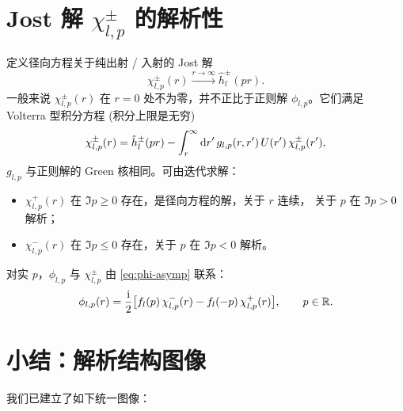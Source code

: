 \section{Jost 解 $\chi^\pm_{l,p}$ 的解析性}\label{sec:jost-solutions}

定义径向方程关于纯出射 / 入射的 Jost 解
\begin{equation}
\chi^\pm_{l,p}(r)\xrightarrow{r\to\infty}\hat h^\pm_l(pr).
\end{equation}
一般来说 $\chi^\pm_{l,p}(r)$ 在 $r=0$ 处不为零，并不正比于正则解
$\phi_{l,p}$。它们满足 Volterra 型积分方程 (积分上限是无穷)
\begin{equation}
\chi^\pm_{l,p}(r)=\hat h^\pm_l(pr)-\int_r^\infty\mathrm{d} r'\,g_{l,p}(r,r')\,U(r')\,\chi^\pm_{l,p}(r'),
\label{eq:chi-volterra}
\end{equation}
$g_{l,p}$ 与正则解的 Green 核相同。可由迭代求解：
\begin{itemize}
\item $\chi^+_{l,p}(r)$ 在 $\Im p\geq 0$ 存在，是径向方程的解，关于 $r$ 连续，
关于 $p$ 在 $\Im p>0$ 解析；
\item $\chi^-_{l,p}(r)$ 在 $\Im p\leq 0$ 存在，关于 $p$ 在 $\Im p<0$ 解析。
\end{itemize}
对实 $p$，$\phi_{l,p}$ 与 $\chi^\pm_{l,p}$ 由 \eqref{eq:phi-asymp} 联系：
\begin{equation}
\phi_{l,p}(r)=\frac{\mathrm{i}}{2}\bigl[f_l(p)\,\chi^-_{l,p}(r)-f_l(-p)\,\chi^+_{l,p}(r)\bigr],\qquad p\in\mathbb{R}.
\end{equation}

\section{小结：解析结构图像}\label{sec:summary}

我们已建立了如下统一图像：

